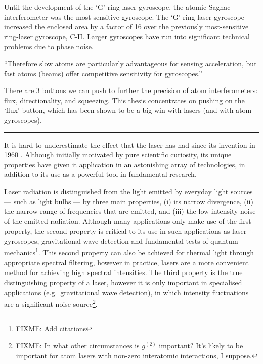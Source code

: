 Until the development of the `G' ring-laser gyroscope, the atomic Sagnac interferometer \citep{Gustavson:2000} was the most sensitive gyroscope.  The `G' ring-laser gyroscope increased the enclosed area by a factor of 16 over the previously most-sensitive ring-laser gyroscope, C-II.  Larger gyroscopes have run into significant technical problems due to phase noise.

``Therefore slow atoms are particularly advantageous for sensing acceleration, but fast atoms (beams) offer competitive sensitivity for gyroscopes.'' \citep{Cronin:2009}


There are 3 buttons we can push to further the precision of atom interferometers: flux, directionality, and squeezing.  This thesis concentrates on pushing on the `flux' button, which has been shown to be a big win with lasers (and with atom gyroscopes).



\hrule


It is hard to underestimate the effect that the laser has had since its invention in 1960 \citep{Maiman:1960}.  Although initially motivated by pure scientific curiosity, its unique properties have given it application in an astonishing array of technologies, in addition to its use as a powerful tool in fundamental research.  

Laser radiation is distinguished from the light emitted by everyday light sources --- such as light bulbs --- by three main properties, (i) its narrow divergence, (ii) the narrow range of frequencies that are emitted, and (iii) the low intensity noise of the emitted radiation.  Although many applications only make use of the first property, the second property is critical to its use in such applications as laser gyroscopes, gravitational wave detection and fundamental tests of quantum mechanics\footnote{FIXME: Add citations}.  This second property can also be achieved for thermal light through appropriate spectral filtering, however in practice, lasers are a more convenient method for achieving high spectral intensities.  The third property is the true distinguishing property of a laser, however it is only important in specialised applications (e.g.\ gravitational wave detection), in which intensity fluctuations are a significant noise source\footnote{FIXME: In what other circumstances is $g^{(2)}$ important?  It's likely to be important for atom lasers with non-zero interatomic interactions, I suppose.}.

